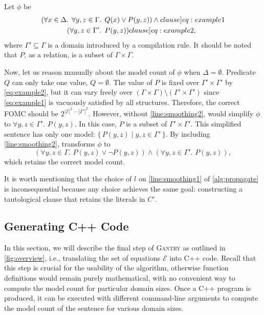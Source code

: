 \documentclass[a4paper,UKenglish,cleveref, autoref, thm-restate]{lipics-v2021}
\newcommand{\Cranetwo}{\textsc{Gantry}}
\begin{document}
\begin{example}\label{example:basecasesmoothing}
  Let $\phi$ be
  \begin{align}
    (\forall x \in \Delta\text{. }\forall y, z \in \Gamma&\text{. }Q(x) \lor P(y, z))\land{}\label[clause]{eq:example1}\\
    (\forall y, z \in \Gamma'&\text{. }P(y, z))\label[clause]{eq:example2},
  \end{align}
  where $\Gamma' \subseteq \Gamma$ is a domain introduced by a compilation rule.
  It should be noted that $P$, as a relation, is a subset of
  $\Gamma \times \Gamma$.

  Now, let us reason manually about the model count of $\phi$ when
  $\Delta = \emptyset$. Predicate $Q$ can only take one value, $Q = \emptyset$.
  The value of $P$ is fixed over $\Gamma' \times \Gamma'$ by \cref{eq:example2},
  but it can vary freely over
  $(\Gamma \times \Gamma) \setminus (\Gamma' \times \Gamma')$ since
  \cref{eq:example1} is vacuously satisfied by all structures. Therefore, the
  correct FOMC should be $2^{|\Gamma|^2 - |\Gamma'|^2}$. However, without
  \autoref{line:smoothing2}, \Propagate would simplify $\phi$ to
  $\forall y, z \in \Gamma'\text{. }P(y, z)$. In this case, $P$ is a subset of
  $\Gamma' \times \Gamma'$. This simplified sentence has only one model:
  $\{\, P(y, z) \mid y, z \in \Gamma' \,\}$. By including
  \autoref{line:smoothing2}, \Propagate transforms $\phi$ to
  \[
    (\forall y, z \in \Gamma\text{. }P(y, z) \lor \neg P(y, z)) \land (\forall y, z \in \Gamma'\text{. }P(y, z)),
  \]
  which retains the correct model count.
\end{example}

It is worth mentioning that the choice of $l$ on \autoref{line:smoothing1} of
\cref{alg:propagate} is inconsequential because any choice achieves the same
goal: constructing a tautological clause that retains the literals in $C'$.

\subsection{Generating C++ Code}\label{sec:cpp}

In this section, we will describe the final step of \Cranetwo{} as outlined in
\cref{fig:overview}, i.e., translating the set of equations $\mathcal{E}$ into
C++ code. Recall that this step is crucial for the usability of the algorithm,
otherwise function definitions would remain purely mathematical, with no
convenient way to compute the model count for particular domain sizes. Once a
C++ program is produced, it can be executed with different command-line
arguments to compute the model count of the sentence for various domain sizes.
\end{document}
